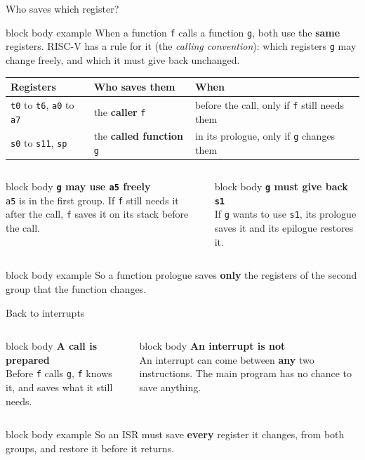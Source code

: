 \documentclass[aspectratio=169,10pt]{beamer}
\newcommand{\defbox}[1]{%
  \begin{beamercolorbox}[rounded=true,sep=0.1cm,wd=\linewidth]{block body example}
    \footnotesize #1
  \end{beamercolorbox}\vspace{0.06cm}}
\newcommand{\stepbox}[2]{%
  \begin{beamercolorbox}[rounded=true,sep=0.09cm,wd=\linewidth]{block body}
    \footnotesize\textbf{#1}\\ #2
  \end{beamercolorbox}\vspace{0.06cm}}
\newcommand{\keymsg}[1]{%
  \begin{beamercolorbox}[rounded=true,sep=0.1cm,wd=\textwidth]{block body example}
    \centering\footnotesize #1
  \end{beamercolorbox}}
\begin{document}
\begin{frame}{Who saves which register?}
  \defbox{When a function \texttt{f} calls a function \texttt{g}, both use the \textbf{same} registers.
    RISC-V has a rule for it (the \emph{calling convention}): which registers \texttt{g} may change freely,
    and which it must give back unchanged.}
  \vspace{0.15cm}
  \begin{center}
    \footnotesize
    \renewcommand{\arraystretch}{1.35}
    \begin{tabular}{lll}
      \toprule
      \textbf{Registers} & \textbf{Who saves them} & \textbf{When} \\
      \midrule
      \texttt{t0} to \texttt{t6}, \texttt{a0} to \texttt{a7} & the \textbf{caller} \texttt{f} & before the call, only if \texttt{f} still needs them \\
      \texttt{s0} to \texttt{s11}, \texttt{sp} & the \textbf{called function} \texttt{g} & in its prologue, only if \texttt{g} changes them \\
      \bottomrule
    \end{tabular}
  \end{center}
  \vfill
  \begin{columns}[T,onlytextwidth]
      \stepbox{\texttt{g} may use \texttt{a5} freely}{\texttt{a5} is in the first group. If \texttt{f} still needs it after the call,
        \texttt{f} saves it on its stack before the call.}
      \stepbox{\texttt{g} must give back \texttt{s1}}{If \texttt{g} wants to use \texttt{s1}, its prologue saves it and its epilogue
        restores it.}
  \end{columns}
  \vfill
  \keymsg{So a function prologue saves \textbf{only} the registers of the second group that the function changes.}
\end{frame}

\begin{frame}{Back to interrupts}
  \vfill
  \begin{columns}[T,onlytextwidth]
      \stepbox{A call is prepared}{Before \texttt{f} calls \texttt{g}, \texttt{f} knows it, and saves what it still needs.}
      \stepbox{An interrupt is not}{An interrupt can come between \textbf{any} two instructions.
        The main program has no chance to save anything.}
  \end{columns}
  \vspace{0.3cm}
  \defbox{So an ISR must save \textbf{every} register it changes, from both groups, and restore it before it returns.}
  \vfill
\end{frame}
\end{document}
